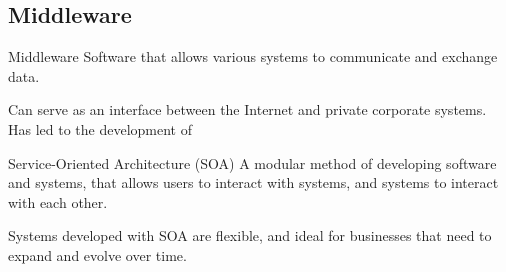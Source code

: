 \documentclass[\main/notes.tex]{subfiles}
\begin{document}
			\subsection{Middleware}
				\begin{definition}{Middleware}
					Software that allows various systems to communicate and exchange data.

					Can serve as an interface between the Internet and private corporate systems. Has led to the development of 
				\end{definition}
				\begin{definition}{Service-Oriented Architecture (SOA)}
					A modular method of developing software and systems, that allows users to interact with systems, and systems to interact with each other.

					Systems developed with SOA are flexible, and ideal for businesses that need to expand and evolve over time.
				\end{definition}
	\vbox{}
\end{document}
